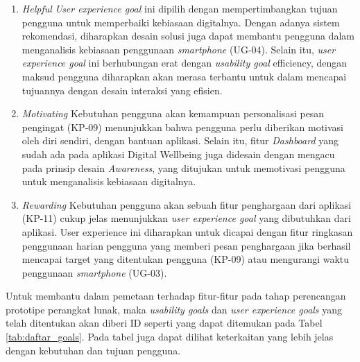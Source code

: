 \begin{enumerate}
  \item \textit{Helpful}
  \subitem \textit{User experience goal} ini dipilih dengan mempertimbangkan tujuan pengguna untuk memperbaiki kebiasaan digitalnya. Dengan adanya sistem rekomendasi, diharapkan desain solusi juga dapat membantu pengguna dalam menganalisis kebiasaan penggunaan \textit{smartphone} (UG-04). Selain itu, \textit{user experience goal} ini berhubungan erat dengan \textit{usability goal} efficiency, dengan maksud pengguna diharapkan akan merasa terbantu untuk dalam mencapai tujuannya dengan desain interaksi yang efisien.

  \item \textit{Motivating}
  \subitem Kebutuhan pengguna akan kemampuan personalisasi pesan pengingat (KP-09) menunjukkan bahwa pengguna perlu diberikan motivasi oleh diri sendiri, dengan bantuan aplikasi. Selain itu, fitur \textit{Dashboard} yang sudah ada pada aplikasi Digital Wellbeing juga didesain dengan mengacu pada prinsip desain \textit{Awareness}, yang ditujukan untuk memotivasi pengguna untuk menganalisis kebiasaan digitalnya.

  \item \textit{Rewarding}
  \subitem Kebutuhan pengguna akan sebuah fitur penghargaan dari aplikasi (KP-11) cukup jelas menunjukkan \textit{user experience goal} yang dibutuhkan dari aplikasi. User experience ini diharapkan untuk dicapai dengan fitur ringkasan penggunaan harian pengguna yang memberi pesan penghargaan jika berhasil mencapai target yang ditentukan pengguna (KP-09) atau mengurangi waktu penggunaan \textit{smartphone} (UG-03).
  
\end{enumerate}

Untuk membantu dalam pemetaan terhadap fitur-fitur pada tahap perencangan prototipe perangkat lunak, maka \textit{usability goals} dan \textit{user experience goals} yang telah ditentukan akan diberi ID seperti yang dapat ditemukan pada Tabel \ref{tab:daftar_goals}. Pada tabel juga dapat dilihat keterkaitan yang lebih jelas dengan kebutuhan dan tujuan pengguna.

